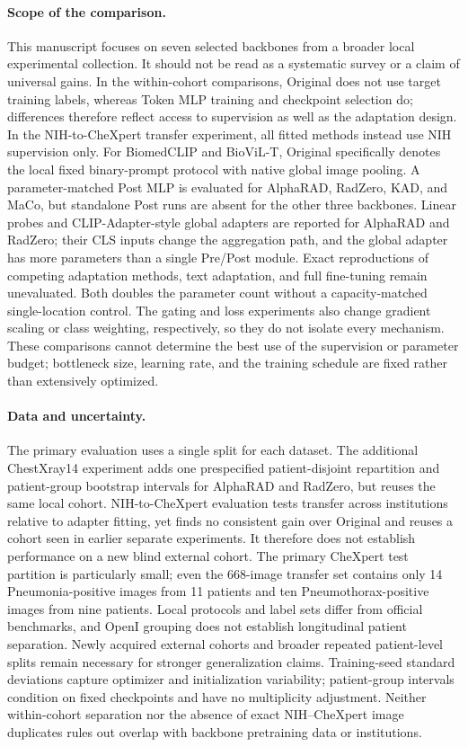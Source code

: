 \documentclass[10pt,twocolumn,letterpaper]{article}
\begin{document}
\paragraph{Scope of the comparison.}
This manuscript focuses on seven selected backbones from a broader local experimental collection. It should not be read as a systematic survey or a claim of universal gains. In the within-cohort comparisons, Original does not use target training labels, whereas Token MLP training and checkpoint selection do; differences therefore reflect access to supervision as well as the adaptation design. In the NIH-to-CheXpert transfer experiment, all fitted methods instead use NIH supervision only. For BiomedCLIP and BioViL-T, Original specifically denotes the local fixed binary-prompt protocol with native global image pooling. A parameter-matched Post MLP is evaluated for AlphaRAD, RadZero, KAD, and MaCo, but standalone Post runs are absent for the other three backbones. Linear probes and CLIP-Adapter-style global adapters are reported for AlphaRAD and RadZero; their CLS inputs change the aggregation path, and the global adapter has more parameters than a single Pre/Post module. Exact reproductions of competing adaptation methods, text adaptation, and full fine-tuning remain unevaluated. Both doubles the parameter count without a capacity-matched single-location control. The gating and loss experiments also change gradient scaling or class weighting, respectively, so they do not isolate every mechanism. These comparisons cannot determine the best use of the supervision or parameter budget; bottleneck size, learning rate, and the training schedule are fixed rather than extensively optimized.

\paragraph{Data and uncertainty.}
The primary evaluation uses a single split for each dataset. The additional ChestXray14 experiment adds one prespecified patient-disjoint repartition and patient-group bootstrap intervals for AlphaRAD and RadZero, but reuses the same local cohort. NIH-to-CheXpert evaluation tests transfer across institutions relative to adapter fitting, yet finds no consistent gain over Original and reuses a cohort seen in earlier separate experiments. It therefore does not establish performance on a new blind external cohort. The primary CheXpert test partition is particularly small; even the 668-image transfer set contains only 14 Pneumonia-positive images from 11 patients and ten Pneumothorax-positive images from nine patients. Local protocols and label sets differ from official benchmarks, and OpenI grouping does not establish longitudinal patient separation. Newly acquired external cohorts and broader repeated patient-level splits remain necessary for stronger generalization claims. Training-seed standard deviations capture optimizer and initialization variability; patient-group intervals condition on fixed checkpoints and have no multiplicity adjustment. Neither within-cohort separation nor the absence of exact NIH--CheXpert image duplicates rules out overlap with backbone pretraining data or institutions.
\end{document}
